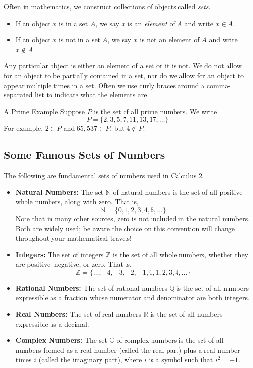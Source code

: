 Often in mathematics, we construct collections of objects called \emph{sets}.  
 \begin{itemize}
 \item  If an object $x$ is in a set $A$, we say $x$ is an \emph{element} of $A$ and write $x\in A $. 
\item If an object $x$ is not in a set $A$, we say $x$ is not an element of $A$ and write $x\not\in A$.
 \end{itemize}
 Any particular object is either an element of a set or it is not.  We do not allow for an object to be partially contained in a set, nor do we allow for an object to appear multiple times in a set.  Often we use curly braces around a comma-separated list to indicate what the elements are.
 \begin{example}{A Prime Example}  Suppose $P$ is the set of all prime numbers.  We write $$P=\lbrace 2,3,5,7,11,13,17,\ldots \rbrace $$ For example, $2\in P$ and $65,537 \in P$, but $4\not\in P$.
 \end{example}

\subsection*{Some Famous Sets of Numbers}
 
 The following are fundamental sets of numbers used in Calculus 2. 
 
 \begin{itemize}
 \item {\bf Natural Numbers:} The set $\mathbb{N}$ of natural numbers is the set of all positive whole numbers, along with zero.  That is, $$\mathbb{N}=\lbrace 0,1,2,3,4,5,\ldots \rbrace $$  Note that in many other sources, zero is not included in the natural numbers. Both are widely used; be aware the choice on this convention will change throughout your mathematical travels!   
 \item {\bf Integers:} The set of integers $\mathbb{Z}$ is the set of all whole numbers, whether they are positive, negative, or zero.  That is, $$\mathbb{Z}=\lbrace \ldots,-4,-3,-2,-1,0,1,2,3,4,\ldots \rbrace $$
 \item {\bf Rational Numbers:} The set of rational numbers $\mathbb{Q}$ is the set of all numbers expressible as a fraction whose numerator and denominator are both integers.
 \item {\bf Real Numbers:} The set of real numbers $\mathbb{R}$ is the set of all numbers expressible as a decimal.
\item {\bf Complex Numbers:} The set $\mathbb{C}$ of complex numbers is the set of all numbers formed as a real number (called the real part) plus a real number times $i$ (called the imaginary part), where $i$ is a symbol such that $i^2=-1$.  
 \end{itemize}
 
